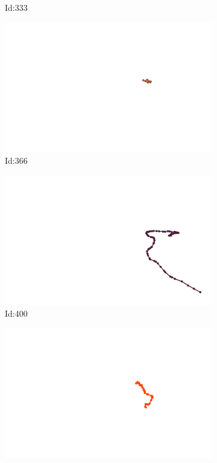 \documentclass[12pt,twoside]{report}
\begin{document}
\begin{figure}
\begin{subfigure}[b]{0.20\textwidth}
\caption{Id:333}
\end{subfigure}
\begin{subfigure}[b]{0.20\textwidth}
\centering
\includegraphics[width=\textwidth]{../trajectories/366.png}
\caption{Id:366}
\end{subfigure}
\begin{subfigure}[b]{0.20\textwidth}
\centering
\includegraphics[width=\textwidth]{../trajectories/400.png}
\caption{Id:400}
\end{subfigure}
\begin{subfigure}[b]{0.20\textwidth}
\centering
\includegraphics[width=\textwidth]{../trajectories/440.png}

\end{subfigure}
\end{figure}
\end{document}
